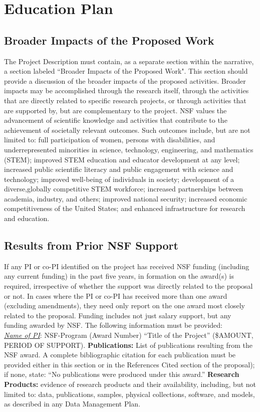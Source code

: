 \section{Education Plan}

\subsection{Broader Impacts of the Proposed Work}
The Project Description must contain, as a separate section within the narrative, a section labeled ``Broader
Impacts of the Proposed Work". This section should provide a discussion of the broader impacts of the proposed
activities. Broader impacts may be accomplished through the research itself, through the activities that are
directly related to specific research projects, or through activities that are supported by, but are complementary to 
the project. NSF values the advancement of scientific knowledge and activities that contribute to the
achievement of societally relevant outcomes. Such outcomes include, but are not limited to: full
participation of women, persons with disabilities, and underrepresented minorities in science, technology, engineering, and
mathematics (STEM); improved STEM education and educator development at any level; increased public
scientific literacy and public engagement with science and technology; improved well-being of individuals in
society; development of a diverse,globally competitive STEM workforce; increased partnerships between
academia, industry, and others; improved national security; increased economic competitiveness of the United
States; and enhanced infrastructure for research and education.

\subsection{Results from Prior NSF Support}
If any PI or co-PI identified on the project has received NSF funding (including any current
funding) in the past five years, in formation on the award(s) is required,
irrespective of whether the support was directly related to the proposal or not.
In cases where the PI or co-PI has received more than one award (excluding amendments),
they need only report on the one award most closely related to the proposal. Funding includes not just salary
support, but any funding awarded by NSF. The following information must be provided:\\

\noindent
\emph{\underline{Name of PI}}: NSF-Program (Award Number) ``Title of the Project'' (\$AMOUNT, PERIOD OF SUPPORT). 
{\bf Publications:} List of publications resulting from the NSF award. A complete bibliographic citation for each
publication must be provided either in this section or in the References Cited section of the proposal); if
none, state: ``No publications were produced under this award.'' {\bf Research Products:} evidence of research products 
and their availability, including, but not limited to: data, publications, samples, physical collections, software, 
and models, as described in any Data Management Plan.


